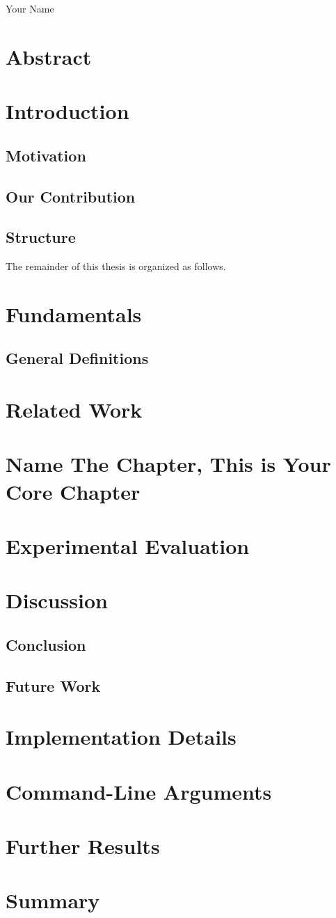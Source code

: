 \documentclass[a4paper,12pt,bibtotoc,titlepage, liststotoc,BCOR7mm,headsepline,pointlessnumbers]{scrbook}
\newcommand{\upbautor}{Your Name} %
\theoremstyle{break} %
\begin{document}
\upbautor

\pagebreak
	
\chapter*{Abstract}
	
	\tableofcontents
	
	\mainmatter
	\newpage
\chapter{Introduction}
\section{Motivation}
\section{Our Contribution}
\section{Structure}
The remainder of this thesis is organized as follows.
	\newpage
\chapter{Fundamentals}
\section{General Definitions}
\chapter{Related Work}
\chapter{Name The Chapter, This is Your Core Chapter}
\chapter{Experimental Evaluation}
\chapter{Discussion}
\section{Conclusion}
\section{Future Work}
\appendix
\chapter*{Implementation Details}
\chapter*{Command-Line Arguments}
\chapter*{Further Results}
\chapter*{Summary}
\newpage
\backmatter


\end{document}
